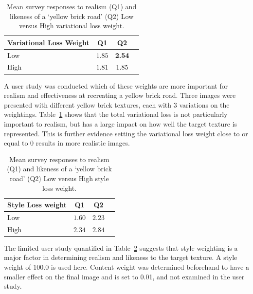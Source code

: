 \documentclass[10pt,twocolumn,letterpaper]{article}
\begin{document}
\begin{table}[htb]
\caption{Mean survey responses to realism (Q1) and likeness of a `yellow brick road' (Q2) Low versus High variational loss weight.}
\vskip 0.15in
\begin{center}
\begin{small}
\begin{sc}
\begin{tabular}{lccr}
\toprule
Variational Loss Weight		& Q1				& Q2 \\
\midrule
Low 	& $1.85$	& \textbf{2.54}  \\
High 	& $1.81$	& 1.85  \\
\bottomrule
\end{tabular}
\end{sc}
\end{small}
\end{center}
\vskip -0.1in
\label{tab:tvweight}
\end{table}

A user study was conducted which of these weights are more important for realism and effectiveness at recreating a yellow brick road. Three images were presented with different yellow brick textures, each with 3 variations on the weightings. Table~\ref{tab:tvweight} shows that the total variational loss is not particularly important to realism, but has a large impact on how well the target texture is represented. This is further evidence setting the variational loss weight close to or equal to 0 results in more realistic images.

\begin{table}[htb]
\caption{Mean survey responses to realism (Q1) and likeness of a `yellow brick road' (Q2) Low versus High style loss weight.}
\vskip 0.15in
\begin{center}
\begin{small}
\begin{sc}
\begin{tabular}{lccr}
\toprule
Style Loss weight				& Q1				& Q2 \\
\midrule
Low 	& $1.60$	& $2.23$  \\
High 	& $2.34$	& $2.84$  \\
\bottomrule
\end{tabular}
\end{sc}
\end{small}
\end{center}
\vskip -0.1in
\label{tab:stweight}
\end{table}

The limited user study quantified in Table~\ref{tab:stweight} suggests that style weighting is a major factor in determining realism and likeness to the target texture. A style weight of 100.0 is used here. Content weight was determined beforehand to have a smaller effect on the final image and is set to 0.01, and not examined in the user study.
\end{document}
